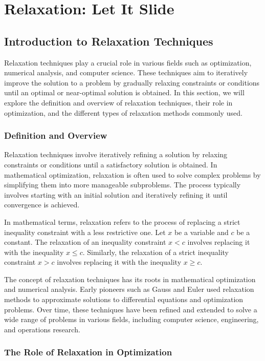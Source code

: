 \documentclass[12pt]{book} %
\begin{document}
\chapter{Relaxation: Let It Slide}

\section{Introduction to Relaxation Techniques}

Relaxation techniques play a crucial role in various fields such as optimization, numerical analysis, and computer science. These techniques aim to iteratively improve the solution to a problem by gradually relaxing constraints or conditions until an optimal or near-optimal solution is obtained. In this section, we will explore the definition and overview of relaxation techniques, their role in optimization, and the different types of relaxation methods commonly used.

\subsection{Definition and Overview}

Relaxation techniques involve iteratively refining a solution by relaxing constraints or conditions until a satisfactory solution is obtained. In mathematical optimization, relaxation is often used to solve complex problems by simplifying them into more manageable subproblems. The process typically involves starting with an initial solution and iteratively refining it until convergence is achieved.

In mathematical terms, relaxation refers to the process of replacing a strict inequality constraint with a less restrictive one. Let \(x\) be a variable and \(c\) be a constant. The relaxation of an inequality constraint \(x < c\) involves replacing it with the inequality \(x \leq c\). Similarly, the relaxation of a strict inequality constraint \(x > c\) involves replacing it with the inequality \(x \geq c\).

The concept of relaxation techniques has its roots in mathematical optimization and numerical analysis. Early pioneers such as Gauss and Euler used relaxation methods to approximate solutions to differential equations and optimization problems. Over time, these techniques have been refined and extended to solve a wide range of problems in various fields, including computer science, engineering, and operations research.

\subsection{The Role of Relaxation in Optimization}
\end{document}
